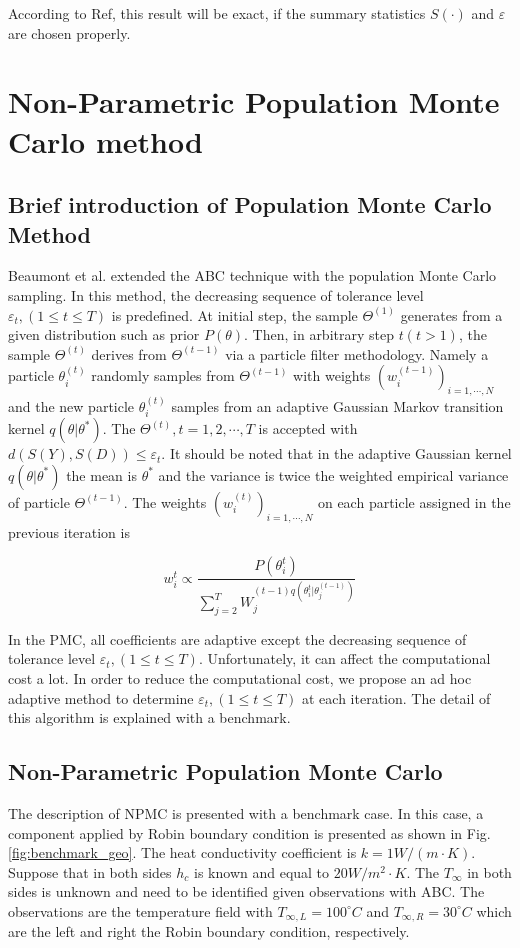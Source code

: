 \documentclass[review]{elsarticle}
\begin{document}
According to Ref\cite{beaumont2002approximate}, this result will be exact, if the summary statistics $S(\cdot)$ and $\varepsilon$ are chosen properly.

\section{Non-Parametric Population Monte Carlo method}

\subsection{Brief introduction of Population Monte Carlo Method}

Beaumont et al.\cite{beaumont2009adaptive} extended the ABC technique with the population Monte Carlo sampling. In this method, the decreasing sequence of tolerance level $\varepsilon_t,(1\leq t \leq T)$ is predefined. At initial step, the sample $\Theta^{(1)}$ generates from a given distribution such as prior $P(\theta)$. Then, in arbitrary step $t (t>1)$, the sample $\Theta^{(t)}$ derives from $\Theta^{(t-1)}$ via a particle filter methodology. Namely a particle $\theta_i^{(t)}$ randomly samples from $\Theta^{(t-1)}$ with weights $\left( w_i^{(t-1)}\right)_{i=1,\cdots,N}$ and the new particle $\theta_i^{(t)}$ samples from an adaptive Gaussian Markov transition kernel $q(\theta|\theta^*)$. The $\Theta^{(t)}, t=1,2,\cdots,T$ is accepted with $d(S(Y),S(D))\leq \varepsilon_t$. It should be noted that in the adaptive Gaussian kernel $q(\theta|\theta^*)$ the mean is $\theta^*$ and the variance is twice the weighted empirical variance of particle $\Theta^{(t-1)}$. The weights $\left( w_i^{(t)}\right)_{i=1,\cdots,N}$ on each particle assigned in the previous iteration is

\begin{equation}
    w_i^t \propto \frac{P(\theta_i^t)}{\sum_{j=2}^T W_j^{(t-1)q(\theta_i^t|\theta_j^{(t-1)})}}
    \label{eq:pmc-weight}
\end{equation}

In the PMC, all coefficients are adaptive except the decreasing sequence of tolerance level $\varepsilon_t,(1\leq t \leq T)$. Unfortunately, it can affect the computational cost a lot. In order to reduce the computational cost, we propose an ad hoc adaptive method to determine $\varepsilon_t,(1\leq t \leq T)$ at each iteration. The detail of this algorithm is explained with a benchmark.

\subsection{Non-Parametric Population Monte Carlo}
The description of NPMC is presented with a benchmark case. In this case, a component applied by Robin boundary condition is presented as shown in Fig.\ref{fig:benchmark_geo}. The heat conductivity coefficient is $k =1 W/(m \cdot K)$. Suppose that in both sides $h_c$ is known and equal to $20W/m^2\cdot K$. The $T_\infty$ in both sides is unknown and need to be identified given observations with ABC. The observations are the temperature field with $T_{\infty, L}=100 ^{\circ}C$ and $T_{\infty, R}=30^{\circ}C$  which are the left and right the Robin boundary condition, respectively. 
\end{document}
